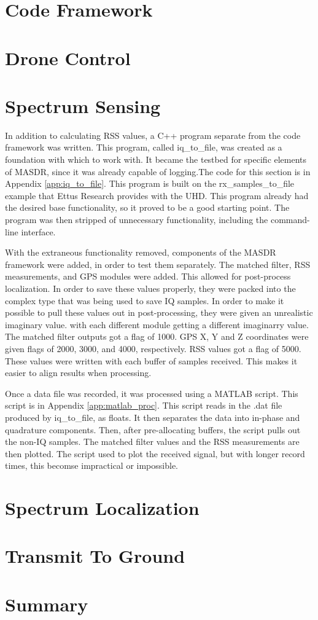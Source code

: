\section{Code Framework}
\section{Drone Control}
\section{Spectrum Sensing}
In addition to calculating RSS values, a C++ program separate from the code framework
was written. This program, called iq\_to\_file, was created as a foundation with 
which to work with. It became the testbed for specific elements of MASDR, since it
was already capable of logging.The code for this section is in Appendix \ref{app:iq_to_file}. 
This program is built on the rx\_samples\_to\_file example that Ettus Research provides 
with the UHD. This program already had the desired base functionality, so it proved
to be a good starting point. The program was then stripped of unnecessary functionality,
including the command-line interface. \par
With the extraneous functionality removed, components of the MASDR framework were
added, in order to test them separately. The matched filter, RSS measurements, 
and GPS modules were added. This allowed for post-process localization. In order to 
save these values properly, they were packed into the complex type that was being
used to save IQ samples. In order to make it possible to pull these values out
in post-processing, they were given an unrealistic imaginary value. with each different 
module getting a different imaginarry value. The matched filter outputs got 
a flag of 1000. GPS X, Y and Z coordinates were given flags of 2000, 3000, and 4000,
respectively. RSS values got a flag of 5000. These values were written with each 
buffer of samples received. This makes it easier to align results when processing.\par
Once a data file was recorded, it was processed using a MATLAB script. This script 
is in Appendix \ref{app:matlab_proc}. This script reads in the .dat file produced 
by iq\_to\_file, as floats. It then separates the data into in-phase and quadrature
components. Then, after pre-allocating buffers, the script pulls out the non-IQ 
samples. The matched filter values and the RSS measurements are then plotted. The
script used to plot the received signal, but with longer record times, this
becomse impractical or impossible.

\section{Spectrum Localization}

\section{Transmit To Ground}
\section{Summary}

